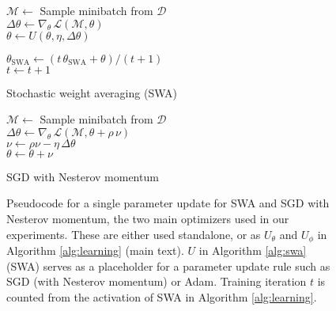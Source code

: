 \documentclass{article} \usepackage{iclr2021_conference,times}
\begin{document}
\begin{figure}[h!]
\centering
\begin{minipage}{0.46\textwidth}
\begin{algorithm}[H]    
  $\mathcal{M} \gets$ Sample minibatch from $\mathcal{D}$\\
 $\Delta \theta \gets \nabla_\theta \, \mathcal{L}(\mathcal{M}, \theta)$\\
 $\theta \gets U(\theta, \eta, \Delta \theta)$
 
 $ \theta_\text{SWA} \gets (t \, \theta_\text{SWA} + \theta)/(t+1) $\\
   $t \gets t + 1 $
  \caption{Stochastic weight averaging (SWA)\label{alg:swa}}
 \end{algorithm}
 \hspace{0.5cm}
\end{minipage}
\begin{minipage}{0.46\textwidth}
\hspace{0.3cm}
\begin{algorithm}[H]    
  $\mathcal{M} \gets$ Sample minibatch from $\mathcal{D}$\\
 $\Delta \theta \gets \nabla_\theta \, \mathcal{L}(\mathcal{M}, \theta + \rho \, \nu)$\\
 $\nu \gets \rho\nu- \eta \, \Delta \theta$\\
   $\theta \gets \theta + \nu $
  \caption{SGD with Nesterov momentum\label{alg:nesterov}}
 \end{algorithm}
\end{minipage}
  \caption{Pseudocode for a single parameter update for SWA and SGD with Nesterov momentum, the two main optimizers used in our experiments. These are either used standalone, or as $U_\theta$ and $U_\phi$ in Algorithm \ref{alg:learning} (main text). $U$ in Algorithm \ref{alg:swa} (SWA) serves as a placeholder for a parameter update rule such as SGD (with Nesterov momentum) or Adam. Training iteration $t$ is counted from the activation of SWA in Algorithm \ref{alg:learning}.}
\end{figure}
\end{document}
